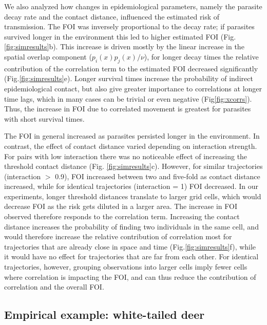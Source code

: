 \documentclass[letterpaper]{article}
\begin{document}
We also analyzed how changes in epidemiological parameters, namely the parasite decay rate and the contact distance, influenced the estimated risk of transmission. 
The FOI was inversely proportional to the decay rate; if parasites survived longer in the environment this led to higher estimated FOI (Fig. \ref{fig:simresults}b). This increase is driven mostly by the linear increase in the spatial overlap component ($p_i(x)p_j(x)/\nu$), for longer decay times the relative contribution of the correlation term to the estimated FOI decreased significantly (Fig.\ref{fig:simresults}e). Longer survival times increase the probability of indirect epidemiological contact, but also give greater importance to correlations at longer time lags, which in many cases can be trivial or even negative  (Fig\ref{fig:xcorrs}). Thus, the increase in FOI due to correlated movement is greatest for parasites with short survival times. 

The FOI in general increased as parasites persisted longer in the environment. In contrast, the effect of contact distance varied depending on interaction strength. For pairs with low interaction there was no noticeable effect of increasing the threshold contact distance (Fig. \ref{fig:simresults}c). However, for  similar trajectories (interaction $>$ 0.9), FOI increased between two and five-fold as contact distance increased, while for identical trajectories (interaction = 1) FOI decreased. 
In our experiments, longer threshold distances translate to larger grid cells, which would decrease FOI as the risk gets diluted in a larger area. The increase in FOI observed therefore responds to the correlation term. Increasing the contact distance increases the probability of finding two individuals in the same cell, and would therefore increase the relative contribution of correlation most for trajectories that are already close in space and time (Fig.\ref{fig:simresults}f), while it would have no effect for trajectories that are far from each other. For identical trajectories, however, grouping observations into larger cells imply fewer cells where correlation is impacting the FOI, and can thus reduce the contribution of correlation and the overall FOI. 

\subsection*{Empirical example: white-tailed deer}
\end{document}
